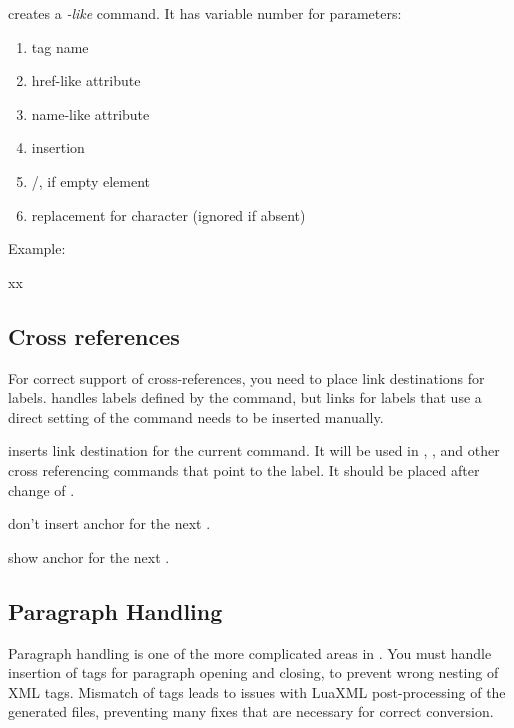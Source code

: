 creates a \textit{-like} command. It has variable number for parameters:

\begin{enumerate}
  \item tag name
  \item href-like attribute
  \item name-like attribute
  \item insertion
  \item /, if empty element
  \item replacement for \texcommand{#} character  (ignored if absent)
\end{enumerate}

Example:

\begin{texsource}
\LinkCommand{}
\def\jsref="#1"{href="javascript:window.open('#1')"}

xx\EndJSLink %
\EndLink       %
\end{texsource}

\subsection{Cross references}

For correct support of cross-references, you need to place link destinations for labels.
\texfourht{} handles labels defined by the  command, 
but links for labels that use a direct setting of the  command needs to be 
inserted manually.

 inserts link destination for the current  command. It will be used 
in ,  , and other cross referencing commands that point to the label.
It should be placed after change of . 

 don't insert anchor for the next .

 show anchor for the next .

\subsection{Paragraph Handling}
\label{sec:paragraph_handling}

Paragraph handling is one of the more complicated areas in \texfourht.
You must handle insertion of tags for paragraph opening and closing,
to prevent wrong nesting of XML tags. Mismatch of tags leads to issues with 
LuaXML post-processing of the generated files, preventing many fixes 
that are necessary for correct conversion.

